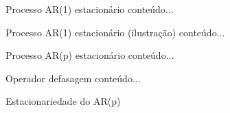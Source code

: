 \documentclass[11pt]{beamer}
\begin{document}
		
	\begin{frame}{Processo AR(1) estacionário}
		conteúdo...
	\end{frame}
	
	\begin{frame}{Processo AR(1) estacionário (ilustração)}
		conteúdo...
	\end{frame}
	
		\begin{frame}{Processo AR(p) estacionário}
		conteúdo...
	\end{frame}
	
	
	\begin{frame}{Operador defasagem}
		conteúdo...
	\end{frame}
	
	\begin{frame}{Estacionariedade do AR(p)}
		\end{frame}
\end{document}
